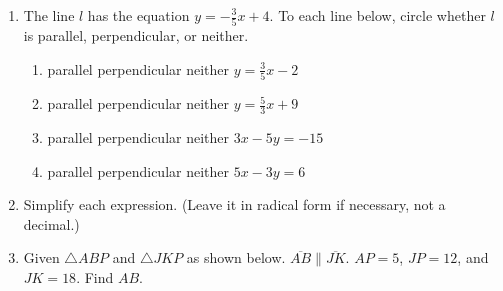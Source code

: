 \documentclass[12pt, twoside]{article}
\begin{document}
\begin{enumerate}
  \item The line $l$ has the equation $y=-\frac{3}{5}x+4$. To each line below, circle whether $l$ is parallel, perpendicular, or neither.
    \begin{enumerate}
      \item parallel \quad perpendicular \quad neither \qquad $y=\frac{3}{5}x-2$
      \vspace{0.5cm}
      \item parallel \quad perpendicular \quad neither \qquad $y=\frac{5}{3}x+9$
      \vspace{0.5cm}
      \item parallel \quad perpendicular \quad neither \qquad $3x-5y=-15$
      \vspace{2cm}
      \item parallel \quad perpendicular \quad neither \qquad $5x-3y=6$
      \vspace{1.7cm}
    \end{enumerate}

  \item Simplify each expression. (Leave it in radical form if necessary, not a decimal.)
    \begin{enumerate}
    \end{enumerate}

\newpage

 \item Given $\triangle ABP$ and $\triangle JKP$ as shown below. $\overline{AB} \parallel \overline{JK}$. $AP=5$, $JP=12$, and $JK=18$. Find $AB$.
 \begin{center}
     \end{center}
 \vspace{2cm}



\end{enumerate}
\end{document}
